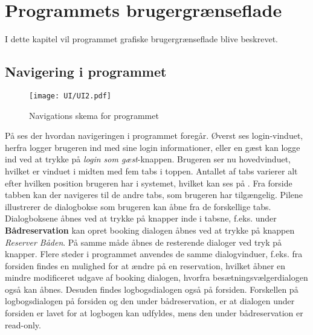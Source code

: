 \chapter{Programmets brugergrænseflade}


I dette kapitel vil programmet grafiske brugergrænseflade blive beskrevet.


\section{Navigering i programmet}

\begin{figure}[H]
\hspace*{-2cm}
\texttt{[image: UI/UI2.pdf]}
\label{img:programNavigation}
\vspace{-310pt}
\caption{Navigations skema for programmet}
\vspace{-20pt}
\end{figure}

På  ses der hvordan navigeringen i programmet foregår.
Øverst ses login-vinduet, herfra logger brugeren ind med sine login informationer, eller en gæst kan logge ind ved at trykke på \textit{login som gæst}-knappen.
Brugeren ser nu hovedvinduet, hvilket er vinduet i midten med fem tabs i toppen.
Antallet af tabs varierer alt efter hvilken position brugeren har i systemet, hvilket kan ses på . 
Fra forside tabben kan der navigeres til de andre tabs, som brugeren har tilgængelig.
Pilene illustrerer de dialogbokse som brugeren kan åbne fra de forskellige tabs.
Dialogboksene åbnes ved at trykke på knapper inde i tabsne, f.eks. under  \textbf{Bådreservation} kan opret booking dialogen åbnes ved at trykke på knappen \textit{Reserver Båden}. 
På samme måde åbnes de resterende dialoger ved tryk på knapper.
Flere steder i programmet anvendes de samme dialogvinduer, f.eks. fra forsiden findes en mulighed for at ændre på en reservation, hvilket åbner en mindre modificeret udgave af booking dialogen, hvorfra besætningsvælgerdialogen også kan åbnes.
Desuden findes logbogsdialogen også på forsiden.
Forskellen på logbogsdialogen på forsiden og den under bådreservation, er at dialogen under forsiden er lavet for at logbogen kan udfyldes, mens den under bådreservation er read-only.


